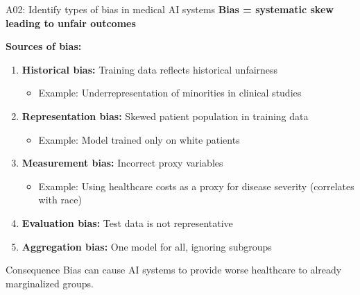 \documentclass[aspectratio=169, 10pt]{beamer}
\begin{document}
\begin{frame}{A02: Identify types of bias in medical AI systems}
    \textbf{Bias = systematic skew leading to unfair outcomes}
    
    \vspace{0.3cm}
    \textbf{Sources of bias:}
    \begin{enumerate}
        \item \textbf{Historical bias:} Training data reflects historical unfairness
        \begin{itemize}
            \item Example: Underrepresentation of minorities in clinical studies
        \end{itemize}
        
        \item \textbf{Representation bias:} Skewed patient population in training data
        \begin{itemize}
            \item Example: Model trained only on white patients
        \end{itemize}
        
        \item \textbf{Measurement bias:} Incorrect proxy variables
        \begin{itemize}
            \item Example: Using healthcare costs as a proxy for disease severity (correlates with race)
        \end{itemize}
        
        \item \textbf{Evaluation bias:} Test data is not representative
        
        \item \textbf{Aggregation bias:} One model for all, ignoring subgroups
    \end{enumerate}
    
    \begin{alertblock}{Consequence}
        Bias can cause AI systems to provide worse healthcare to already marginalized groups.
    \end{alertblock}
\end{frame}
\end{document}
